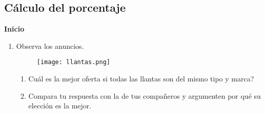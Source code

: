 \subsection{Cálculo del porcentaje}

\begin{boxK}
    \begin{center}\textbf{Inicio}\end{center}

    \begin{enumerate}
        \item Observa los anuncios.
              \begin{figure}[H]
                  \centering
                  \texttt{[image: llantas.png]}
              \end{figure}
              \begin{enumerate}
                  \item Cuál es la mejor oferta si todas las llantas son del mismo tipo y marca?
                  \item Compara tu respuesta con la de tus compañeros y argumenten por qué su elección es la mejor.
              \end{enumerate}
    \end{enumerate}
\end{boxK}
